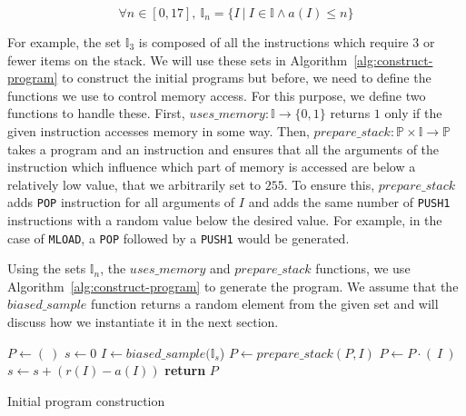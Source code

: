   \begin{equation}
    \label{eq:instr-args}
    \forall n \in [0, 17],~ \mathbb{I}_n = \{I~|~I\in \mathbb{I} \land a(I) \leq n\}
  \end{equation}

  For example, the set $\mathbb{I}_3$ is composed of all the instructions which require $3$ or fewer items on the stack.
  We will use these sets in Algorithm~\ref{alg:construct-program} to construct the initial programs but before, we need to define the functions we use to control memory access. For this purpose, we define two functions to handle these. First, $uses\_memory : \mathbb{I} \rightarrow \{0, 1\}$ returns $1$ only if the given instruction accesses memory in some way. Then, $prepare\_stack: \mathbb{P}\times\mathbb{I}\rightarrow \mathbb{P}$ takes a program and an instruction and ensures that all the arguments of the instruction which influence which part of memory is accessed are below a relatively low value, that we arbitrarily set to $255$. To ensure this, $prepare\_stack$ adds \lstinline{POP} instruction for all arguments of $I$ and adds the same number of \lstinline{PUSH1} instructions with a random value below the desired value. For example, in the case of \lstinline{MLOAD}, a \lstinline{POP} followed by a \lstinline{PUSH1} would be generated.

  Using the sets $\mathbb{I}_n$, the $uses\_memory$ and $prepare\_stack$ functions, we use Algorithm~\ref{alg:construct-program} to generate the program. We assume that the $biased\_sample$ function returns a random element from the given set and will discuss how we instantiate it in the next section.

  \begin{algorithm}
    \begin{algorithmic}
      \State $P \gets (~)$
      \State $s\gets 0$
      \State $I \gets biased\_sample(\mathbb{I}_s$)
        \State $P \gets prepare\_stack(P, I)$
        \EndIf
        \State $P \gets P \cdot (~I~)$
        \State $s \gets s + (r(I) - a(I))$
        \EndFor
        \State \textbf{return} $P$
      \EndFunction
    \end{algorithmic}
    \caption{Initial program construction}
    \label{alg:construct-program}
  \end{algorithm}


